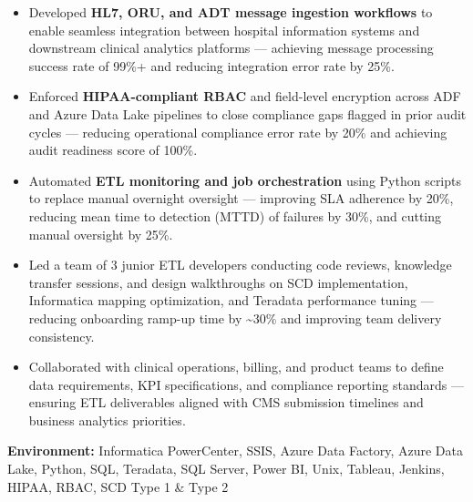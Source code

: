 \documentclass[a4paper,10pt]{article}
\begin{document}
\begin{itemize}
    \item Developed \textbf{HL7, ORU, and ADT message ingestion workflows} to enable seamless integration between hospital information systems and downstream clinical analytics platforms — achieving message processing success rate of 99\%+ and reducing integration error rate by 25\%.
    \item Enforced \textbf{HIPAA-compliant RBAC} and field-level encryption across ADF and Azure Data Lake pipelines to close compliance gaps flagged in prior audit cycles — reducing operational compliance error rate by 20\% and achieving audit readiness score of 100\%.
    \item Automated \textbf{ETL monitoring and job orchestration} using Python scripts to replace manual overnight oversight — improving SLA adherence by 20\%, reducing mean time to detection (MTTD) of failures by 30\%, and cutting manual oversight by 25\%.
    \item Led a team of 3 junior ETL developers conducting code reviews, knowledge transfer sessions, and design walkthroughs on SCD implementation, Informatica mapping optimization, and Teradata performance tuning — reducing onboarding ramp-up time by \textasciitilde 30\% and improving team delivery consistency.
    \item Collaborated with clinical operations, billing, and product teams to define data requirements, KPI specifications, and compliance reporting standards — ensuring ETL deliverables aligned with CMS submission timelines and business analytics priorities.
\end{itemize}

\textbf{Environment:} Informatica PowerCenter, SSIS, Azure Data Factory, Azure Data Lake, Python, SQL, Teradata, SQL Server, Power BI, Unix, Tableau, Jenkins, HIPAA, RBAC, SCD Type 1 \& Type 2
\end{document}
